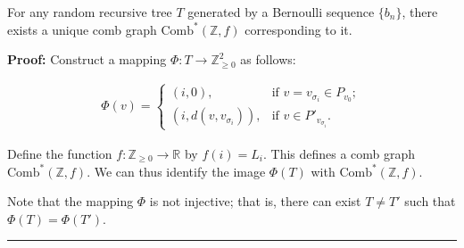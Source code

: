 \documentclass[10pt,a4paper]{amsart}
\renewenvironment{proof}[1]{\noindent\textbf{#1}}{\ \rule{0.5em}{0.5em}}
\begin{document}
\begin{lemma}\label{lem3}
For any random recursive tree $T$ generated by a Bernoulli sequence $\{b_n\}$, there exists a unique comb graph $\mathrm{Comb}^*(\mathbb{Z}, f)$ corresponding to it.
\end{lemma}

\begin{proof}
P\textbf{roof: }Construct a mapping $\Phi: T \to \mathbb{Z}_{\geq 0}^2$ as follows:
 

\begin{eqnarray}
\Phi(v) =
\begin{cases}
(i, 0), & \text{if } v = v_{\sigma_i} \in P_{v_0}; \\
(i, d(v, v_{\sigma_i})), & \text{if } v \in P'_{v_{\sigma_i}}.
\end{cases}
\end{eqnarray}

 
Define the function $f: \mathbb{Z}_{\geq 0} \to \mathbb{R}$ by $f(i) = L_i$. This defines a comb graph $\mathrm{Comb}^*(\mathbb{Z}, f)$. We can thus identify the image $\Phi(T)$ with $\mathrm{Comb}^*(\mathbb{Z}, f)$.

Note that the mapping $\Phi$ is not injective; that is, there can exist $T \neq T'$ such that $\Phi(T) = \Phi(T')$.
\end{proof}
\end{document}
